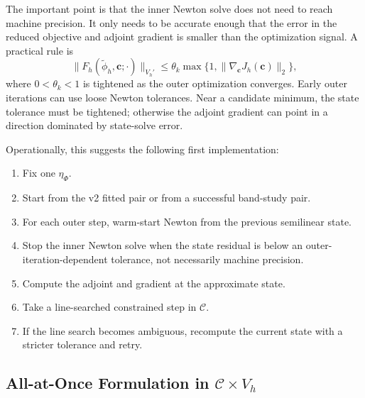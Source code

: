 \documentclass[11pt]{article}
\newcommand{\cvec}{\bm c}
\begin{document}
The important point is that the inner Newton solve does not need to reach
machine precision.  It only needs to be accurate enough that the error in the
reduced objective and adjoint gradient is smaller than the optimization
signal.  A practical rule is
\[
  \|F_h(\widetilde\phi_h,\cvec;\cdot)\|_{V_h'}
  \le
  \theta_k
  \max\{1,\|\nabla_{\cvec}J_h(\cvec)\|_2\},
\]
where \(0<\theta_k<1\) is tightened as the outer optimization converges.
Early outer iterations can use loose Newton tolerances.  Near a candidate
minimum, the state tolerance must be tightened; otherwise the adjoint gradient
can point in a direction dominated by state-solve error.

Operationally, this suggests the following first implementation:
\begin{enumerate}[label=\arabic*.]
  \item Fix one \(\eta_\Phi\).
  \item Start from the v2 fitted pair or from a successful band-study pair.
  \item For each outer step, warm-start Newton from the previous semilinear
  state.
  \item Stop the inner Newton solve when the state residual is below an
  outer-iteration-dependent tolerance, not necessarily machine precision.
  \item Compute the adjoint and gradient at the approximate state.
  \item Take a line-searched constrained step in \(\mathcal C\).
  \item If the line search becomes ambiguous, recompute the current state with
  a stricter tolerance and retry.
\end{enumerate}

\subsection{All-at-Once Formulation in \texorpdfstring{\(\mathcal C\times V_h\)}{C x Vh}}
\end{document}
